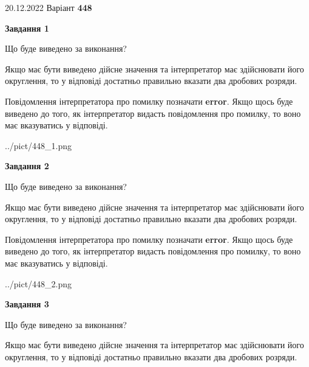 \documentclass[12pt, ukrainian]{article}
\begin{document}
{20.12.2022 Варіант \No \textbf { 448 }\par}
{
\begin {Large}

{\begin {center}\textbf{Завдання 1}\end {center}}\par
Що буде виведено за виконання? \par

Якщо має бути виведено дійсне значення та інтерпретатор має здійснювати його округлення, 
то у відповіді достатньо правильно вказати два дробових розряди.

Повідомлення інтерпретатора про помилку позначати \textbf{error}.
Якщо щось буде виведено до того, як інтерпретатор видасть повідомлення про помилку, 
то воно має вказуватись у відповіді. \par

\begin{center}
	{../pict/448_1.png}
\end{center}
\newpage

{\begin {center}\textbf{Завдання 2}\end {center}}\par
Що буде виведено за виконання? \par

Якщо має бути виведено дійсне значення та інтерпретатор має здійснювати його округлення, 
то у відповіді достатньо правильно вказати два дробових розряди.

Повідомлення інтерпретатора про помилку позначати \textbf{error}.
Якщо щось буде виведено до того, як інтерпретатор видасть повідомлення про помилку, 
то воно має вказуватись у відповіді. \par

\begin{center}
	{../pict/448_2.png}
\end{center}
\newpage

{\begin {center}\textbf{Завдання 3}\end {center}}\par
Що буде виведено за виконання? \par

Якщо має бути виведено дійсне значення та інтерпретатор має здійснювати його округлення, 
то у відповіді достатньо правильно вказати два дробових розряди.


\end{Large}}
\end{document}
